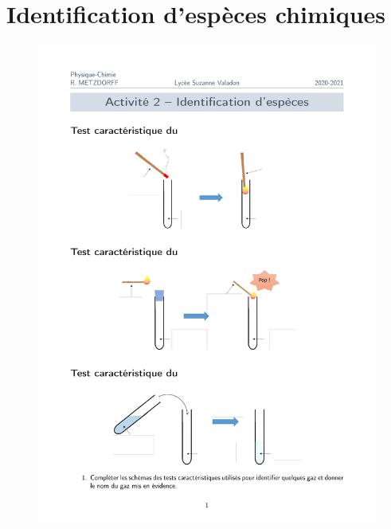 \section{Identification d'espèces chimiques}

\begin{figure}[h]
\center
\includegraphics[page=1,scale=0.4]{chap1_act2.pdf}

\end{figure}
